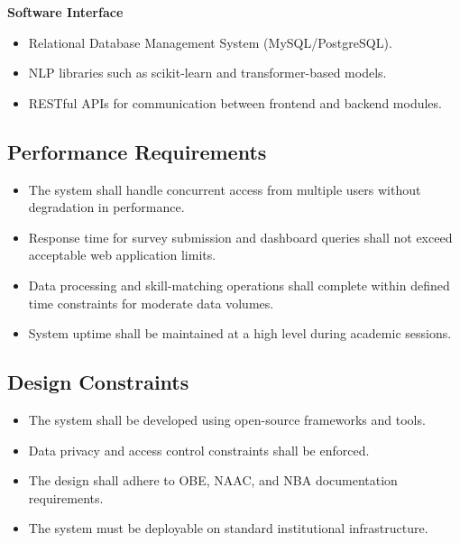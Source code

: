 \textbf{Software Interface}
\begin{itemize}
    \item Relational Database Management System (MySQL/PostgreSQL).
    \item NLP libraries such as scikit-learn and transformer-based models.
    \item RESTful APIs for communication between frontend and backend modules.
\end{itemize}

\subsection{Performance Requirements}
\begin{itemize}
    \item The system shall handle concurrent access from multiple users without degradation in performance.
    \item Response time for survey submission and dashboard queries shall not exceed acceptable web application limits.
    \item Data processing and skill-matching operations shall complete within defined time constraints for moderate data volumes.
    \item System uptime shall be maintained at a high level during academic sessions.
\end{itemize}

\subsection{Design Constraints}
\begin{itemize}
    \item The system shall be developed using open-source frameworks and tools.
    \item Data privacy and access control constraints shall be enforced.
    \item The design shall adhere to OBE, NAAC, and NBA documentation requirements.
    \item The system must be deployable on standard institutional infrastructure.
\end{itemize}

